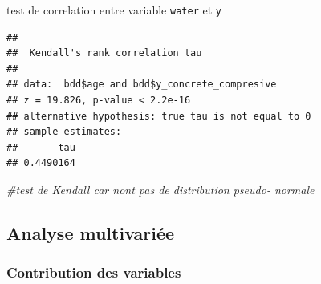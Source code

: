 \documentclass[
  12pt,
]{article}
\newenvironment{Shaded}{\begin{snugshade}}{\end{snugshade}}
\newcommand{\AttributeTok}[1]{\textcolor[rgb]{0.13,0.29,0.53}{#1}}
\newcommand{\CommentTok}[1]{\textcolor[rgb]{0.56,0.35,0.01}{\textit{#1}}}
\newcommand{\FloatTok}[1]{\textcolor[rgb]{0.00,0.00,0.81}{#1}}
\newcommand{\FunctionTok}[1]{\textcolor[rgb]{0.13,0.29,0.53}{\textbf{#1}}}
\newcommand{\NormalTok}[1]{#1}
\newcommand{\OtherTok}[1]{\textcolor[rgb]{0.56,0.35,0.01}{#1}}
\newcommand{\SpecialCharTok}[1]{\textcolor[rgb]{0.81,0.36,0.00}{\textbf{#1}}}
\newcommand{\StringTok}[1]{\textcolor[rgb]{0.31,0.60,0.02}{#1}}
\begin{document}
test de correlation entre variable \texttt{water} et \texttt{y}

\begin{Shaded}
\end{Shaded}

\begin{verbatim}
## 
##  Kendall's rank correlation tau
## 
## data:  bdd$age and bdd$y_concrete_compresive
## z = 19.826, p-value < 2.2e-16
## alternative hypothesis: true tau is not equal to 0
## sample estimates:
##       tau 
## 0.4490164
\end{verbatim}

\begin{Shaded}
\begin{Highlighting}[]
\CommentTok{\#test de Kendall car n\textquotesingle{}ont pas de distribution pseudo{-} normale}
\end{Highlighting}
\end{Shaded}

\subsection{Analyse multivariée}\label{analyse-multivariuxe9e-1}

\subsubsection{Contribution des
variables}\label{contribution-des-variables}

\begin{Shaded}
\end{Shaded}
\end{document}
